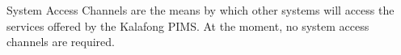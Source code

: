System Access Channels are the means by which other systems will access the services offered by the Kalafong PIMS.
At the moment, no system access channels are required.